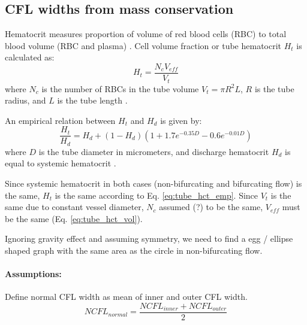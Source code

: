 \subsection{CFL widths from mass conservation}
Hematocrit measures proportion of volume of red blood cells (RBC) to total 
blood volume (RBC and plasma) \cite{BillettHct}. Cell volume fraction or tube 
hematocrit $H_t$ is calculated as:
\begin{equation} \label{eq:tube_hct_vol}
H_t = \frac{N_c V_{eff}}{V_t}
\end{equation}
where $N_c$ is the number of RBCs in the tube volume $V_t = \pi R^2 L$, $R$ is 
the tube radius, and $L$ is the tube length \cite{MICC:MICC56}.

An empirical relation between $H_t$ and $H_d$ is given by:
\begin{equation} \label{eq:tube_hct_emp}
\frac{H_t}{H_d} = H_d + (1 - H_d) \left (1 + 1.7e^{-0.35D} - 0.6e^{-0.01D} 
\right)
\end{equation}
where $D$ is the tube diameter in micrometers, and discharge hematocrit $H_d$ 
is equal to systemic hematocrit \cite{lamkin2004impact}.

Since systemic hematocrit in both cases (non-bifurcating and bifurcating flow) 
is the same, $H_t$ is the same according to Eq. \ref{eq:tube_hct_emp}. Since 
$V_t$ is the same due to constant vessel diameter, $N_c$ assumed (?) to be the 
same, $V_{eff}$ must be the same (Eq. \ref{eq:tube_hct_vol}).

Ignoring gravity effect and assuming symmetry, we need to find a egg / ellipse 
shaped graph with the same area as the circle in non-bifurcating flow.


\paragraph{Assumptions:}
Define normal CFL width as mean of inner and outer CFL width.
\begin{equation}
NCFL_{normal} = \frac{NCFL_{inner} + NCFL_{outer}}{2}
\end{equation}
